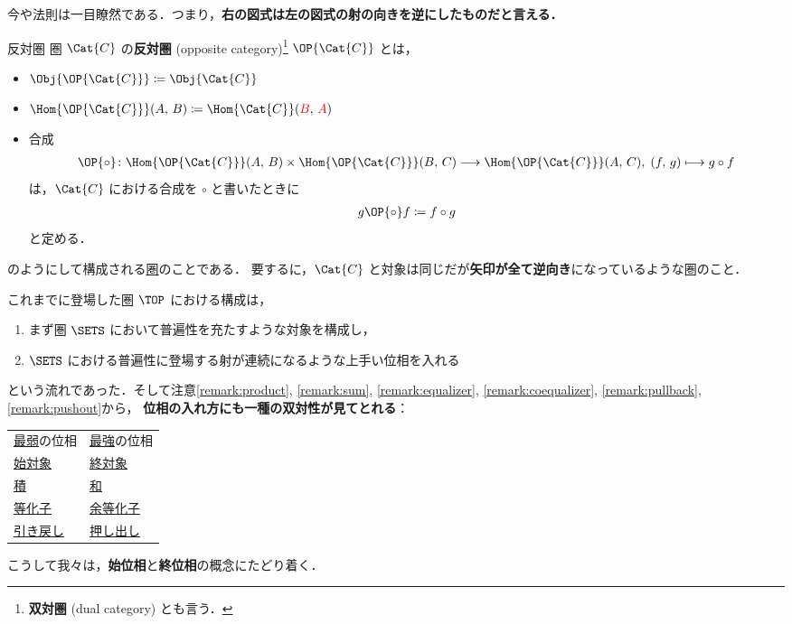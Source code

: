 \documentclass[geometry_main]{subfiles}
\begin{document}
今や法則は一目瞭然である．つまり，\textbf{右の図式は左の図式の射の向きを逆にしたものだと言える．}
\begin{mydef}[label=def:op-category, breakable]{反対圏}
	圏 $\Cat{C}$ の\textbf{反対圏} (opposite category)\footnote{\textbf{双対圏} (dual category) とも言う．} $\OP{\Cat{C}}$ とは，
	\begin{itemize}
		\item $\Obj{\OP{\Cat{C}}} \coloneqq \Obj{\Cat{C}}$
		\item $\Hom{\OP{\Cat{C}}} (A,\, B) \coloneqq \Hom{\Cat{C}}(\textcolor{red}{B},\, \textcolor{red}{A})$
		\item 合成
		\begin{align}
			\OP{\circ} \colon \Hom{\OP{\Cat{C}}}(A,\, B) \times \Hom{\OP{\Cat{C}}}(B,\, C) \lto \Hom{\OP{\Cat{C}}}(A,\, C),\; (f,\, g) \lmto g\circ f
		\end{align}
		は，$\Cat{C}$ における合成を $\circ$ と書いたときに
		\begin{align}
			g \OP{\circ} f \coloneqq f \circ g
		\end{align}
		と定める．
	\end{itemize}
	のようにして構成される\hyperref[def:category]{圏}のことである．
	要するに，$\Cat{C}$ と対象は同じだが\textbf{矢印が全て逆向き}になっているような圏のこと．
\end{mydef}

これまでに登場した圏 $\TOP$ における構成は，
\begin{enumerate}
	\item まず圏 $\SETS$ において普遍性を充たすような対象を構成し，
	\item $\SETS$ における普遍性に登場する射が連続になるような上手い位相を入れる
\end{enumerate}
という流れであった．そして注意\ref{remark:product}, \ref{remark:sum}, \ref{remark:equalizer}, \ref{remark:coequalizer}, \ref{remark:pullback}, \ref{remark:pushout}から，
\textbf{位相の入れ方にも一種の双対性が見てとれる}：
\begin{table}[H]
	\centering
	\begin{tabular}{l|l}
		\multicolumn{1}{c}{\hyperref[def.intensity_topo]{最弱}の位相} &
		\multicolumn{1}{|c}{\hyperref[def.intensity_topo]{最強}の位相} \\
		\hhline{-|-} 
		\hyperref[def:initial-terminal]{始対象} &\hyperref[def:initial-terminal]{終対象} \\
		\hyperref[def:product]{積} &\hyperref[def:sum]{和} \\
		\hyperref[def:equalizer]{等化子} &\hyperref[def:coequalizer]{余等化子} \\
		\hyperref[def:pullback]{引き戻し} &\hyperref[def:pushout]{押し出し} \\
	\end{tabular}
\end{table}%
こうして我々は，\textbf{始位相}と\textbf{終位相}の概念にたどり着く．
\end{document}

